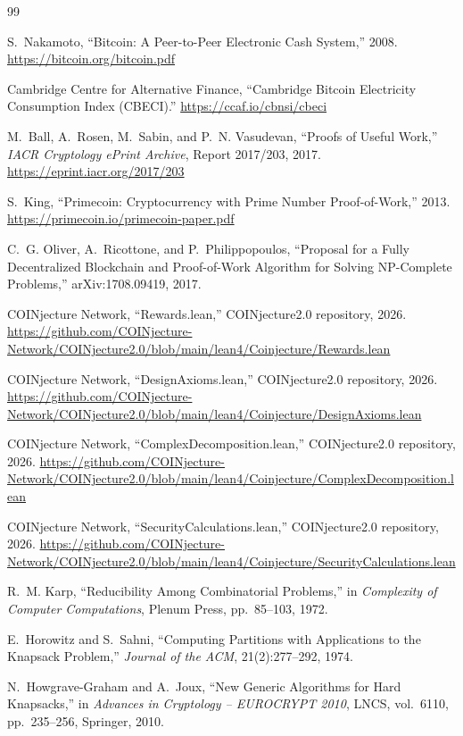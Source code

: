 \documentclass[12pt,letterpaper]{article}
\begin{document}
\begin{thebibliography}{99}

S.~Nakamoto, ``Bitcoin: A Peer-to-Peer Electronic Cash System,'' 2008.
\url{https://bitcoin.org/bitcoin.pdf}

Cambridge Centre for Alternative Finance, ``Cambridge Bitcoin Electricity Consumption Index (CBECI).''
\url{https://ccaf.io/cbnsi/cbeci}

M.~Ball, A.~Rosen, M.~Sabin, and P.~N. Vasudevan, ``Proofs of Useful Work,''
\textit{IACR Cryptology ePrint Archive}, Report 2017/203, 2017.
\url{https://eprint.iacr.org/2017/203}

S.~King, ``Primecoin: Cryptocurrency with Prime Number Proof-of-Work,'' 2013.
\url{https://primecoin.io/primecoin-paper.pdf}

C.~G. Oliver, A.~Ricottone, and P.~Philippopoulos, ``Proposal for a Fully Decentralized Blockchain
and Proof-of-Work Algorithm for Solving NP-Complete Problems,'' arXiv:1708.09419, 2017.

COINjecture Network, ``Rewards.lean,'' COINjecture2.0 repository, 2026.
\url{https://github.com/COINjecture-Network/COINjecture2.0/blob/main/lean4/Coinjecture/Rewards.lean}

COINjecture Network, ``DesignAxioms.lean,'' COINjecture2.0 repository, 2026.
\url{https://github.com/COINjecture-Network/COINjecture2.0/blob/main/lean4/Coinjecture/DesignAxioms.lean}

COINjecture Network, ``ComplexDecomposition.lean,'' COINjecture2.0 repository, 2026.
\url{https://github.com/COINjecture-Network/COINjecture2.0/blob/main/lean4/Coinjecture/ComplexDecomposition.lean}

COINjecture Network, ``SecurityCalculations.lean,'' COINjecture2.0 repository, 2026.
\url{https://github.com/COINjecture-Network/COINjecture2.0/blob/main/lean4/Coinjecture/SecurityCalculations.lean}

R.~M. Karp, ``Reducibility Among Combinatorial Problems,'' in \textit{Complexity of Computer
Computations}, Plenum Press, pp.~85--103, 1972.

E.~Horowitz and S.~Sahni, ``Computing Partitions with Applications to the Knapsack Problem,''
\textit{Journal of the ACM}, 21(2):277--292, 1974.

N.~Howgrave-Graham and A.~Joux, ``New Generic Algorithms for Hard Knapsacks,'' in
\textit{Advances in Cryptology -- EUROCRYPT 2010}, LNCS, vol.~6110, pp.~235--256, Springer, 2010.


\end{thebibliography}
\end{document}
